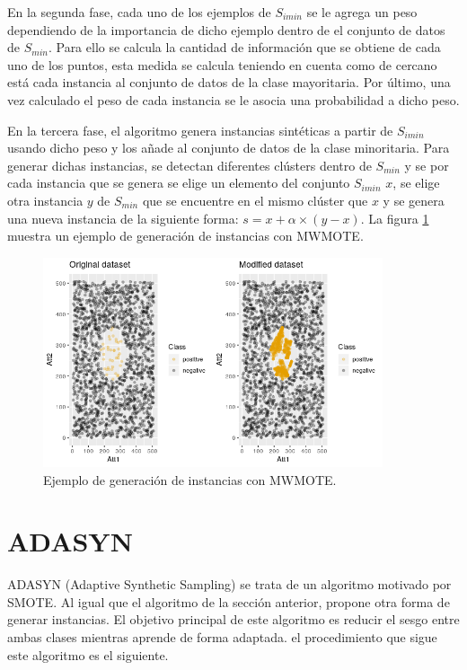 En la segunda fase, cada uno de los ejemplos de $S_{imin}$ se le agrega un peso dependiendo de la importancia de dicho ejemplo dentro de el conjunto de datos de $S_{min}$. Para ello se calcula la cantidad de información que se obtiene de cada uno de los puntos, esta medida se calcula teniendo en cuenta como de cercano está cada instancia al conjunto de datos de la clase mayoritaria. Por último, una vez calculado el peso de cada instancia se le asocia una probabilidad a dicho peso.\newline

En la tercera fase, el algoritmo genera instancias sintéticas a partir de $S_{imin}$ usando dicho peso y los añade al conjunto de datos de la clase minoritaria. Para generar dichas instancias, se detectan diferentes clústers dentro de $S_{min}$ y se por cada instancia que se genera se elige un elemento del conjunto $S_{imin}$ $x$, se elige otra instancia $y$ de $S_{min}$ que se encuentre en el mismo clúster que $x$ y se genera una nueva instancia de la siguiente forma: $ s = x + \alpha \times (y-x)$. La figura \ref{fig:42} muestra un ejemplo de generación de instancias con MWMOTE.\newline
\newpage

\begin{figure}[h]
	\centering
	\includegraphics[width=100mm]{imagenes/MWMOTE_comparison.png}
	\caption{Ejemplo de generación de instancias con MWMOTE.}
	\label{fig:42}
\end{figure}
\verticalspace

\section{ADASYN}
ADASYN (Adaptive Synthetic Sampling) \cite{he2008adasyn} se trata de un algoritmo motivado por SMOTE. Al igual que el algoritmo de la sección anterior, propone otra forma de generar instancias. El objetivo principal de este algoritmo es reducir el sesgo entre ambas clases mientras aprende de forma adaptada. el procedimiento que sigue este algoritmo es el siguiente.\newline

